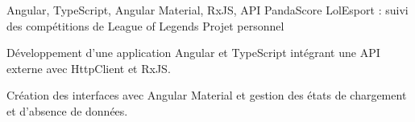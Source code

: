 
\begin{cventries}
  \cventry
    {Angular, TypeScript, Angular Material, RxJS, API PandaScore}
    {LolEsport : suivi des compétitions de League of Legends}
    {Projet personnel}
    {}
    {
      \begin{cvitems}
        \item {Développement d’une application Angular et TypeScript intégrant une API externe avec HttpClient et RxJS.}
        \item {Création des interfaces avec Angular Material et gestion des états de chargement et d’absence de données.}
      \end{cvitems}
    }
\end{cventries}
